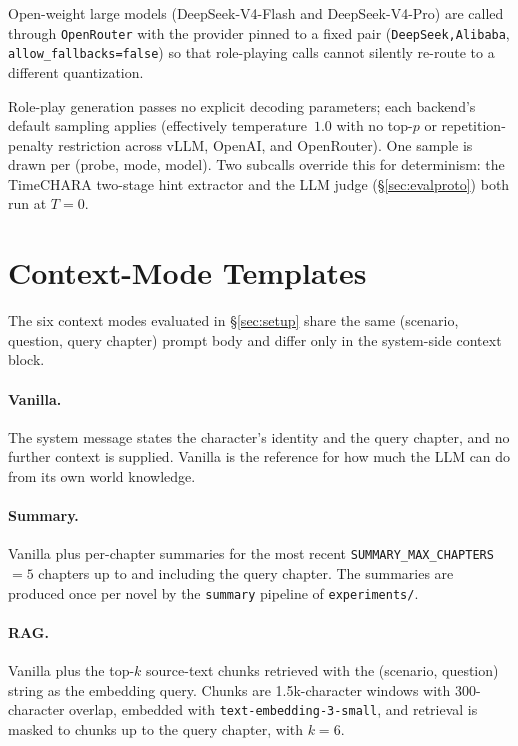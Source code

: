\documentclass{llmxive}
\begin{document}
Open-weight large models (DeepSeek-V4-Flash and DeepSeek-V4-Pro) are called through \texttt{OpenRouter} with the provider pinned to a fixed pair (\texttt{DeepSeek,Alibaba}, \texttt{allow\_fallbacks=false}) so that role-playing calls cannot silently re-route to a different quantization. 

Role-play generation passes no explicit decoding parameters; each backend's default sampling applies (effectively temperature~$1.0$ with no top-$p$ or repetition-penalty restriction across vLLM, OpenAI, and OpenRouter). One sample is drawn per (probe, mode, model). Two subcalls override this for determinism: the TimeCHARA two-stage hint extractor and the LLM judge (\S\ref{sec:evalproto}) both run at $T=0$.






\section{Context-Mode Templates\label{app:contextmodes}}

The six context modes evaluated in \S\ref{sec:setup} share the same (scenario, question, query chapter) prompt body and differ only in the system-side context block.

\paragraph{Vanilla.}
The system message states the character's identity and the query chapter, and no further context is supplied. Vanilla is the reference for how much the LLM can do from its own world knowledge.

\paragraph{Summary.}
Vanilla plus per-chapter summaries for the most recent \texttt{SUMMARY\_MAX\_CHAPTERS}~$=5$ chapters up to and including the query chapter. The summaries are produced once per novel by the \texttt{summary} pipeline of \texttt{experiments/}.

\paragraph{RAG.}
Vanilla plus the top-$k$ source-text chunks retrieved with the (scenario, question) string as the embedding query. Chunks are 1.5k-character windows with 300-character overlap, embedded with \texttt{text-embedding-3-small}, and retrieval is masked to chunks up to the query chapter, with $k=6$.
\end{document}
